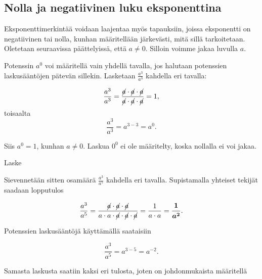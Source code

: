 \subsection*{Nolla ja negatiivinen luku eksponenttina}

Eksponenttimerkintää voidaan laajentaa myös tapauksiin, joissa eksponentti on negatiivinen tai nolla, kunhan määritellään järkevästi, mitä sillä tarkoitetaan. Oletetaan seuraavissa päättelyissä, että $a \neq 0$. Silloin voimme jakaa luvulla $a$.

Potenssin $a^0$ voi määritellä vain yhdellä tavalla, jos halutaan potenssien laskusääntöjen pätevän sillekin. Lasketaan $\frac{a^3}{a^3}$ kahdella eri tavalla:

    \[
        \frac{a^3}{a^3}=\frac{\cancel{a}\cdot \cancel{a}\cdot \cancel{a}}
        {\cancel{a}\cdot \cancel{a}\cdot \cancel{a}}=1,
    \]
	toisaalta
 \[ \frac{a^3}{a^3}=a^{3-3}=a^0. \]

Siis $a^0=1$, kunhan $a\neq 0$.  Laskua $0^0$ ei ole määritelty, koska nollalla ei voi jakaa. 
 
  
    
    \begin{esimerkki}
        Laske
    \end{esimerkki}    
    
Sievennetään sitten osamäärä $\frac{a^3}{a^5}$ kahdella eri tavalla. Supistamalla yhteiset tekijät saadaan lopputulos
    
    \begin{equation*}
        \frac{a^3}{a^5} =
        \frac{\cancel{a}\cdot \cancel{a}\cdot \cancel{a}}{a\cdot a\cdot
        \cancel{a}\cdot \cancel{a}\cdot \cancel{a}} = 
        \frac{1}{a\cdot a}=\boldsymbol{\frac{1}{a^2}}.
    \end{equation*}
    
Potenssien laskusääntöjä käyttämällä saataisiin
    
    \begin{equation*}
        \frac{a^3}{a^5} = a^{3-5}= a^{-2}{.}
    \end{equation*}
    
Samasta laskusta saatiin kaksi eri tulosta, joten on johdonmukaista määritellä
    
